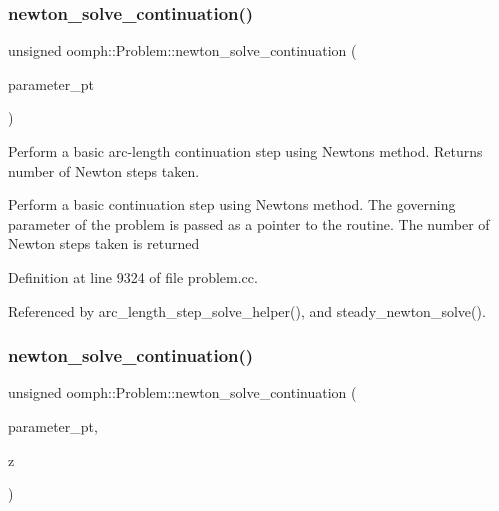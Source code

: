 \mbox{\label{classoomph_1_1Problem_aea0efdeb4814de433fa2ffb3065831ce}} 
\subsubsection{\texorpdfstring{newton\+\_\+solve\+\_\+continuation()}{newton\_solve\_continuation()}\hspace{0.1cm}{\footnotesize\ttfamily [1/2]}}
{\footnotesize\ttfamily unsigned oomph\+::\+Problem\+::newton\+\_\+solve\+\_\+continuation (\begin{DoxyParamCaption}\item[{double $\ast$const \&}]{parameter\+\_\+pt }\end{DoxyParamCaption})\hspace{0.3cm}{\ttfamily [protected]}}



Perform a basic arc-\/length continuation step using Newton\textquotesingle{}s method. Returns number of Newton steps taken. 

Perform a basic continuation step using Newton\textquotesingle{}s method. The governing parameter of the problem is passed as a pointer to the routine. The number of Newton steps taken is returned 

Definition at line 9324 of file problem.\+cc.



Referenced by arc\+\_\+length\+\_\+step\+\_\+solve\+\_\+helper(), and steady\+\_\+newton\+\_\+solve().

\mbox{\label{classoomph_1_1Problem_aa539429593ad9ffe3a400a72db2063bd}} 
\subsubsection{\texorpdfstring{newton\+\_\+solve\+\_\+continuation()}{newton\_solve\_continuation()}\hspace{0.1cm}{\footnotesize\ttfamily [2/2]}}
{\footnotesize\ttfamily unsigned oomph\+::\+Problem\+::newton\+\_\+solve\+\_\+continuation (\begin{DoxyParamCaption}\item[{double $\ast$const \&}]{parameter\+\_\+pt,  }\item[{\hyperlink{classoomph_1_1DoubleVector}{Double\+Vector} \&}]{z }\end{DoxyParamCaption})\hspace{0.3cm}{\ttfamily [protected]}}



